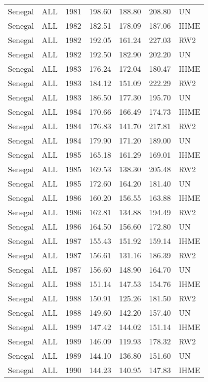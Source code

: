 \begin{longtable}{lllrrrl}
  Senegal & ALL & 1981 & 198.60 & 188.80 & 208.80 & UN \\ 
  Senegal & ALL & 1982 & 182.51 & 178.09 & 187.06 & IHME \\ 
  Senegal & ALL & 1982 & 192.05 & 161.24 & 227.03 & RW2 \\ 
  Senegal & ALL & 1982 & 192.50 & 182.90 & 202.20 & UN \\ 
  Senegal & ALL & 1983 & 176.24 & 172.04 & 180.47 & IHME \\ 
  Senegal & ALL & 1983 & 184.12 & 151.09 & 222.29 & RW2 \\ 
  Senegal & ALL & 1983 & 186.50 & 177.30 & 195.70 & UN \\ 
  Senegal & ALL & 1984 & 170.66 & 166.49 & 174.73 & IHME \\ 
  Senegal & ALL & 1984 & 176.83 & 141.70 & 217.81 & RW2 \\ 
  Senegal & ALL & 1984 & 179.90 & 171.20 & 189.00 & UN \\ 
  Senegal & ALL & 1985 & 165.18 & 161.29 & 169.01 & IHME \\ 
  Senegal & ALL & 1985 & 169.53 & 138.30 & 205.48 & RW2 \\ 
  Senegal & ALL & 1985 & 172.60 & 164.20 & 181.40 & UN \\ 
  Senegal & ALL & 1986 & 160.20 & 156.55 & 163.88 & IHME \\ 
  Senegal & ALL & 1986 & 162.81 & 134.88 & 194.49 & RW2 \\ 
  Senegal & ALL & 1986 & 164.50 & 156.60 & 172.80 & UN \\ 
  Senegal & ALL & 1987 & 155.43 & 151.92 & 159.14 & IHME \\ 
  Senegal & ALL & 1987 & 156.61 & 131.16 & 186.39 & RW2 \\ 
  Senegal & ALL & 1987 & 156.60 & 148.90 & 164.70 & UN \\ 
  Senegal & ALL & 1988 & 151.14 & 147.53 & 154.76 & IHME \\ 
  Senegal & ALL & 1988 & 150.91 & 125.26 & 181.50 & RW2 \\ 
  Senegal & ALL & 1988 & 149.60 & 142.20 & 157.40 & UN \\ 
  Senegal & ALL & 1989 & 147.42 & 144.02 & 151.14 & IHME \\ 
  Senegal & ALL & 1989 & 146.09 & 119.93 & 178.32 & RW2 \\ 
  Senegal & ALL & 1989 & 144.10 & 136.80 & 151.60 & UN \\ 
  Senegal & ALL & 1990 & 144.23 & 140.95 & 147.83 & IHME \\ 

\end{longtable}
